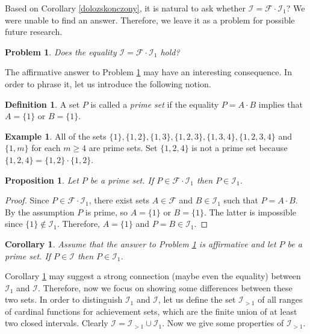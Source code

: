 \documentclass{amsart}
\newtheorem{proposition}[theorem]{Proposition}
\newtheorem{problem}[theorem]{Problem}
\newtheorem{corollary}[theorem]{Corollary}
\theoremstyle{definition}
\newtheorem{definition}[theorem]{Definition}
\newtheorem{example}[theorem]{Example}
\begin{document}
Based on Corollary \ref{dolozskonczony}, it is natural to ask whether $\mathcal{I}=\mathcal{F}\cdot\mathcal{I}_{1}$? We were unable to find an answer. Therefore, we leave it as a problem for possible future research.

\begin{problem}\label{ProblemI=FI_1}
    Does the equality $\mathcal{I}=\mathcal{F}\cdot \mathcal{I}_1$ hold?
\end{problem}

The affirmative answer to Problem \ref{ProblemI=FI_1} may have an interesting consequence. In order to phrase it, let us introduce the following notion.

\begin{definition}
A set $P$ is called a {\it prime set} if the equality $P=A\cdot B$ implies that $A=\{1\}$ or $B=\{1\}$.
\end{definition}

\begin{example}
All of the sets $\{1\}, \{1,2\}, \{1,3\}, \{1,2,3\}, \{1,3,4\},\{1,2,3,4\}$ and $\{1,m\}$ for each $m\geq 4$ are prime sets. Set $\{1,2,4\}$ is not a prime set because  $\{1,2,4\}= \{1,2\}\cdot  \{1,2\}$.
\end{example}

\begin{proposition}
Let $P$ be a prime set. If $P\in \mathcal{F}\cdot \mathcal{I}_{1}$ then $P\in\mathcal{I}_{1}$.
\end{proposition}
\begin{proof}
Since $P\in \mathcal{F}\cdot \mathcal{I}_{1}$, there exist sets $A\in\mathcal{F}$ and $B\in\mathcal{I}_{1}$ such that $P=A\cdot B$. By the assumption $P$ is prime, so $A=\{1\}$ or $B=\{1\}$. The latter is impossible since $\{1\}\notin \mathcal{I}_{1}$. Therefore, $A=\{1\}$ and $P=B\in\mathcal{I}_{1}$.
\end{proof}

\begin{corollary}\label{CorBasedOnProblem}
Assume that the answer to Problem \ref{ProblemI=FI_1} is affirmative and let $P$ be a prime set. If $P\in\mathcal{I}$ then $P\in\mathcal{I}_{1}$.
\end{corollary}


Corollary \ref{CorBasedOnProblem} may suggest a strong connection (maybe even the equality) between $\mathcal{I}_{1}$ and $\mathcal{I}$. Therefore, now we focus on showing some differences between these two sets. In order to distinguish $\mathcal{I}_1$ and $\mathcal{I}$, let us define the set $\mathcal{I}_{>1}$ of all ranges of cardinal functions for achievement sets, which are the finite union of at least two closed intervals. Clearly $\mathcal{I}=\mathcal{I}_{>1}\cup \mathcal{I}_1$. Now we give some properties of $\mathcal{I}_{>1}$.
\end{document}
